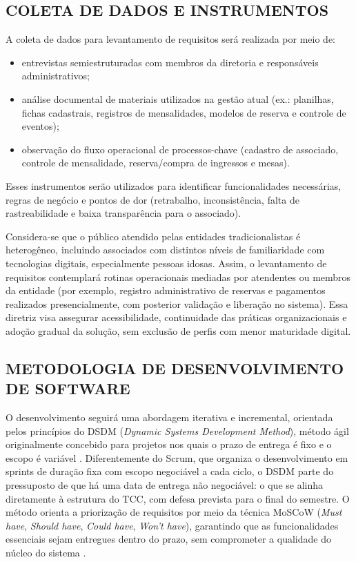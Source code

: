 ﻿\documentclass[12pt,a4paper]{article}
\begin{document}
\subsection{COLETA DE DADOS E INSTRUMENTOS}

A coleta de dados para levantamento de requisitos será realizada por meio de:
\begin{itemize}[leftmargin=*]
    \item entrevistas semiestruturadas com membros da diretoria e responsáveis administrativos;
    \item análise documental de materiais utilizados na gestão atual (ex.: planilhas, fichas cadastrais, registros de mensalidades, modelos de reserva e controle de eventos);
    \item observação do fluxo operacional de processos-chave (cadastro de associado, controle de mensalidade, reserva/compra de ingressos e mesas).
\end{itemize}

Esses instrumentos serão utilizados para identificar funcionalidades necessárias, regras de negócio e pontos de dor (retrabalho, inconsistência, falta de rastreabilidade e baixa transparência para o associado).

Considera-se que o público atendido pelas entidades tradicionalistas é heterogêneo, incluindo associados com distintos níveis de familiaridade com tecnologias digitais, especialmente pessoas idosas. Assim, o levantamento de requisitos contemplará rotinas operacionais mediadas por atendentes ou membros da entidade (por exemplo, registro administrativo de reservas e pagamentos realizados presencialmente, com posterior validação e liberação no sistema). Essa diretriz visa assegurar acessibilidade, continuidade das práticas organizacionais e adoção gradual da solução, sem exclusão de perfis com menor maturidade digital.

\subsection{METODOLOGIA DE DESENVOLVIMENTO DE SOFTWARE}

O desenvolvimento seguirá uma abordagem iterativa e incremental, orientada pelos princípios do DSDM (\textit{Dynamic Systems Development Method}), método ágil originalmente concebido para projetos nos quais o prazo de entrega é fixo e o escopo é variável \citep{stapleton1997,dsm2014}. Diferentemente do Scrum, que organiza o desenvolvimento em sprints de duração fixa com escopo negociável a cada ciclo, o DSDM parte do pressuposto de que há uma data de entrega não negociável: o que se alinha diretamente à estrutura do TCC, com defesa prevista para o final do semestre. O método orienta a priorização de requisitos por meio da técnica MoSCoW (\textit{Must have}, \textit{Should have}, \textit{Could have}, \textit{Won't have}), garantindo que as funcionalidades essenciais sejam entregues dentro do prazo, sem comprometer a qualidade do núcleo do sistema \citep{dsm2014}.
\end{document}
